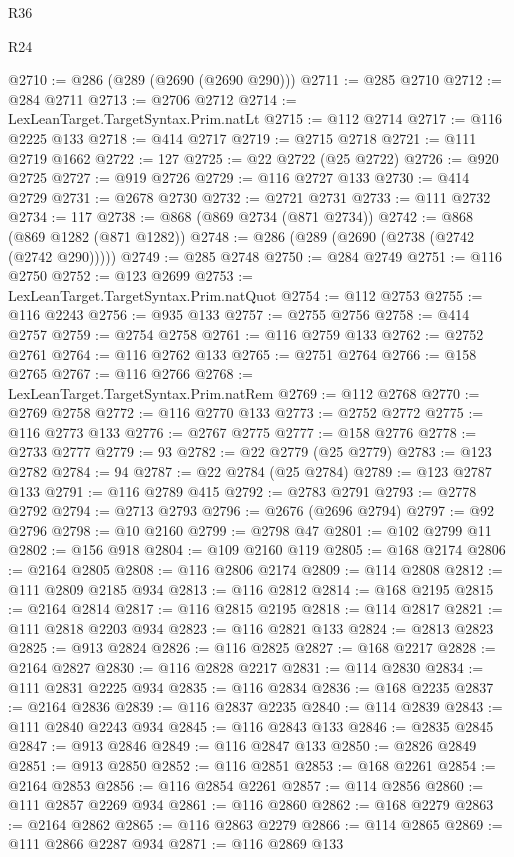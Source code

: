 \begin{lexlean}{R36}
\begin{lexlean}{R24}
\begin{coremodule}
{{{{{{{{{{{{{{{{{{{{{{{{{{{{{{{{{{{{{{{{{{{{{{{{{{{{{{{{{{{{{{{{{{{{{{{{{{{{{{{{{{{{{{{{{{{{{{{{{{{{{{{{{{{{{{{{{{{{{{{{{{{{{{{{{{{{{{{{{{{{{{{{{{{{{{{{{{{{{{{{{{{{{{{{{{{{{{{{{{{{{{{{{{{{{{{{{{{@2710 := @286 (@289 (@2690 (@2690 @290)))
@2711 := @285 @2710
@2712 := @284 @2711
@2713 := @2706 @2712
@2714 := LexLeanTarget.TargetSyntax.Prim.natLt
@2715 := @112 @2714
@2717 := @116 @2225 @133
@2718 := @414 @2717
@2719 := @2715 @2718
@2721 := @111 @2719 @1662
@2722 := 127
@2725 := @22 @2722 (@25 @2722)
@2726 := @920 @2725
@2727 := @919 @2726
@2729 := @116 @2727 @133
@2730 := @414 @2729
@2731 := @2678 @2730
@2732 := @2721 @2731
@2733 := @111 @2732
@2734 := 117
@2738 := @868 (@869 @2734 (@871 @2734))
@2742 := @868 (@869 @1282 (@871 @1282))
@2748 := @286 (@289 (@2690 (@2738 (@2742 (@2742 @290)))))
@2749 := @285 @2748
@2750 := @284 @2749
@2751 := @116 @2750
@2752 := @123 @2699
@2753 := LexLeanTarget.TargetSyntax.Prim.natQuot
@2754 := @112 @2753
@2755 := @116 @2243
@2756 := @935 @133
@2757 := @2755 @2756
@2758 := @414 @2757
@2759 := @2754 @2758
@2761 := @116 @2759 @133
@2762 := @2752 @2761
@2764 := @116 @2762 @133
@2765 := @2751 @2764
@2766 := @158 @2765
@2767 := @116 @2766
@2768 := LexLeanTarget.TargetSyntax.Prim.natRem
@2769 := @112 @2768
@2770 := @2769 @2758
@2772 := @116 @2770 @133
@2773 := @2752 @2772
@2775 := @116 @2773 @133
@2776 := @2767 @2775
@2777 := @158 @2776
@2778 := @2733 @2777
@2779 := 93
@2782 := @22 @2779 (@25 @2779)
@2783 := @123 @2782
@2784 := 94
@2787 := @22 @2784 (@25 @2784)
@2789 := @123 @2787 @133
@2791 := @116 @2789 @415
@2792 := @2783 @2791
@2793 := @2778 @2792
@2794 := @2713 @2793
@2796 := @2676 (@2696 @2794)
@2797 := @92 @2796
@2798 := @10 @2160
@2799 := @2798 @47
@2801 := @102 @2799 @11
@2802 := @156 @918
@2804 := @109 @2160 @119
@2805 := @168 @2174
@2806 := @2164 @2805
@2808 := @116 @2806 @2174
@2809 := @114 @2808
@2812 := @111 @2809 @2185 @934
@2813 := @116 @2812
@2814 := @168 @2195
@2815 := @2164 @2814
@2817 := @116 @2815 @2195
@2818 := @114 @2817
@2821 := @111 @2818 @2203 @934
@2823 := @116 @2821 @133
@2824 := @2813 @2823
@2825 := @913 @2824
@2826 := @116 @2825
@2827 := @168 @2217
@2828 := @2164 @2827
@2830 := @116 @2828 @2217
@2831 := @114 @2830
@2834 := @111 @2831 @2225 @934
@2835 := @116 @2834
@2836 := @168 @2235
@2837 := @2164 @2836
@2839 := @116 @2837 @2235
@2840 := @114 @2839
@2843 := @111 @2840 @2243 @934
@2845 := @116 @2843 @133
@2846 := @2835 @2845
@2847 := @913 @2846
@2849 := @116 @2847 @133
@2850 := @2826 @2849
@2851 := @913 @2850
@2852 := @116 @2851
@2853 := @168 @2261
@2854 := @2164 @2853
@2856 := @116 @2854 @2261
@2857 := @114 @2856
@2860 := @111 @2857 @2269 @934
@2861 := @116 @2860
@2862 := @168 @2279
@2863 := @2164 @2862
@2865 := @116 @2863 @2279
@2866 := @114 @2865
@2869 := @111 @2866 @2287 @934
@2871 := @116 @2869 @133
}}}}}}}}}}}}}}}}}}}}}}}}}}}}}}}}}}}}}}}}}}}}}}}}}}}}}}}}}}}}}}}}}}}}}}}}}}}}}}}}}}}}}}}}}}}}}}}}}}}}}}}}}}}}}}}}}}}}}}}}}}}}}}}}}}}}}}}}}}}}}}}}}}}}}}}}}}}}}}}}}}}}}}}}}}}}}}}}}}}}}}}}}}}}}}}}}}}
\end{coremodule}
\end{lexlean}
\end{lexlean}
